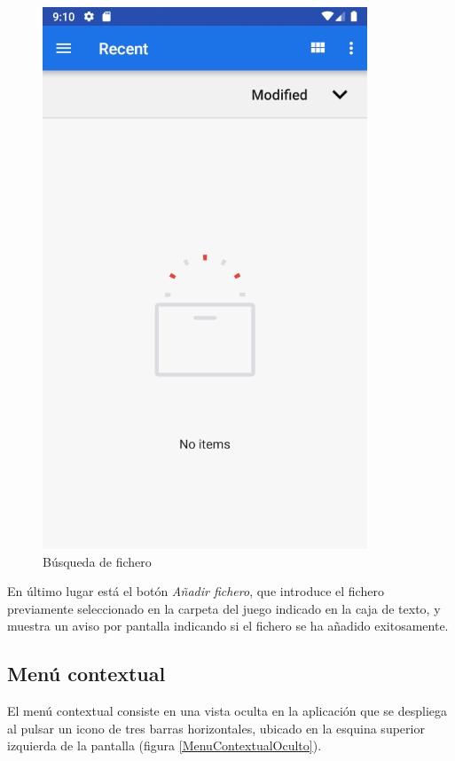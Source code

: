 \begin{figure}[H]
    \centering
    \includegraphics[scale=0.3]{Figures/Capturas/SistemaFicheros.png}
    \caption{Búsqueda de fichero}
    \label{SeleccionarFichero1}    
\end{figure}

En último lugar está el botón \textit{Añadir fichero}, que introduce el fichero previamente 
seleccionado en la carpeta del juego indicado en la caja de texto, y muestra un aviso por pantalla indicando si 
el fichero se ha añadido exitosamente.

\subsection{Menú contextual}
El menú contextual consiste en una vista oculta en la aplicación que se despliega al pulsar un icono de 
tres barras horizontales, ubicado en la esquina superior izquierda de la pantalla (figura \ref*{MenuContextualOculto}).

